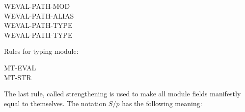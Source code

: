 \begin{description}
\item[WEVAL-PATH-MOD]
\item[WEVAL-PATH-ALIAS]
\item[WEVAL-PATH-TYPE]
\item[WEVAL-PATH-TYPE]
\end{description}
 Rules for typing module:
\begin{description}
\item[MT-EVAL]
\item[MT-STR]
\end{description}
The last rule, called strengthening is used to make all module fields
manifestly equal to themselves. The notation $S/p$ has the following
meaning:
